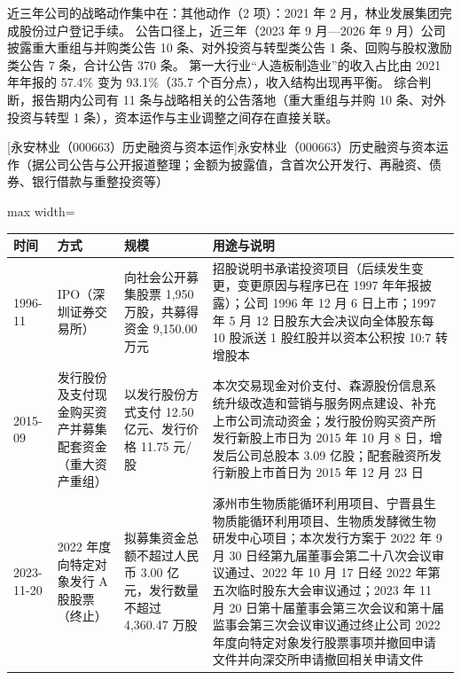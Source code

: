  近三年公司的战略动作集中在：其他动作（2 项）：2021 年 2 月，林业发展集团完成股份过户登记手续。 公告口径上，近三年（2023 年 9 月---2026 年 9 月）公司披露重大重组与并购类公告 10 条、对外投资与转型类公告 1 条、回购与股权激励类公告 7 条，合计公告 370 条。 第一大行业“人造板制造业”的收入占比由 2021 年年报的 57.4\% 变为 93.1\%（35.7 个百分点），收入结构出现再平衡。 综合判断，报告期内公司有 11 条与战略相关的公告落地（重大重组与并购 10 条、对外投资与转型 1 条），资本运作与主业调整之间存在直接关联。

\begin{center}\small\setlength{\tabcolsep}{4pt}
[永安林业（000663）历史融资与资本运作]{永安林业（000663）历史融资与资本运作（据公司公告与公开报道整理；金额为披露值，含首次公开发行、再融资、债券、银行借款与重整投资等）}
\begin{adjustbox}{max width=\textwidth}
\begin{tabular}{@{}p{1.45cm}p{2.55cm}p{4.05cm}p{4.95cm}@{}}
\toprule
时间 & 方式 & 规模 & 用途与说明 \\
\midrule
1996-11 & IPO（深圳证券交易所） & 向社会公开募集股票 1,\allowbreak{}950 万股，\allowbreak{}共募得资金 9,\allowbreak{}150.00 万元 & 招股说明书承诺投资项目（后续发生变更，\allowbreak{}变更原因与程序已在 1997 年年报披露）；公司 1996 年 12 月 6 日上市；1997 年 5 月 12 日股东大会决议向全体股东每 10 股派送 1 股红股并以资本公积按 10:7 转增股本 \\
2015-09 & 发行股份及支付现金购买资产并募集配套资金（重大资产重组） & 以发行股份方式支付 12.50 亿元、\allowbreak{}发行价格 11.75 元/\allowbreak{}股 & 本次交易现金对价支付、\allowbreak{}森源股份信息系统升级改造和营销与服务网点建设、\allowbreak{}补充上市公司流动资金；发行股份购买资产所发行新股上市日为 2015 年 10 月 8 日，\allowbreak{}增发后公司总股本 3.09 亿股；配套融资所发行新股上市首日为 2015 年 12 月 23 日 \\
2023-11-20 & 2022 年度向特定对象发行 A 股股票（终止） & 拟募集资金总额不超过人民币 3.00 亿元，\allowbreak{}发行数量不超过 4,\allowbreak{}360.47 万股 & 涿州市生物质能循环利用项目、\allowbreak{}宁晋县生物质能循环利用项目、\allowbreak{}生物质发酵微生物研发中心项目；本次发行方案于 2022 年 9 月 30 日经第九届董事会第二十八次会议审议通过、\allowbreak{}2022 年 10 月 17 日经 2022 年第五次临时股东大会审议通过；2023 年 11 月 20 日第十届董事会第三次会议和第十届监事会第三次会议审议通过终止公司 2022 年度向特定对象发行股票事项并撤回申请文件并向深交所申请撤回相关申请文件 \\
\bottomrule
\end{tabular}
\end{adjustbox}
\end{center}

